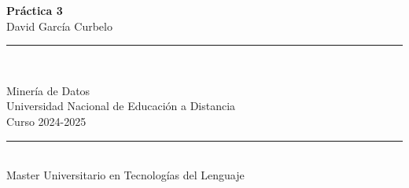 \documentclass[a4paper,12pt]{article}
\begin{document}
\begin{titlepage}
    \centering
    \vspace*{1cm}

    {\Huge \textbf{Práctica 3}} \\[0.5cm]
    {\Large {David García Curbelo}}

    \vspace*{1cm}
    \rule{0.05\linewidth}{0.3mm} \\[0.4cm]
    \vspace*{1cm}

    \begin{large}
        Minería de Datos \\[0.2cm]
        Universidad Nacional de Educación a Distancia \\[0.5cm]
        Curso 2024-2025
    \end{large}

    \vfill

    \begin{minipage}{0.8\textwidth}
        \centering
        \vspace{0.5cm}
        \rule{0.9\linewidth}{0.3mm} \\[0.4cm]
        Master Universitario en Tecnologías del Lenguaje
    \end{minipage}
\end{titlepage}

\newpage
\tableofcontents
\newpage




\end{document}
